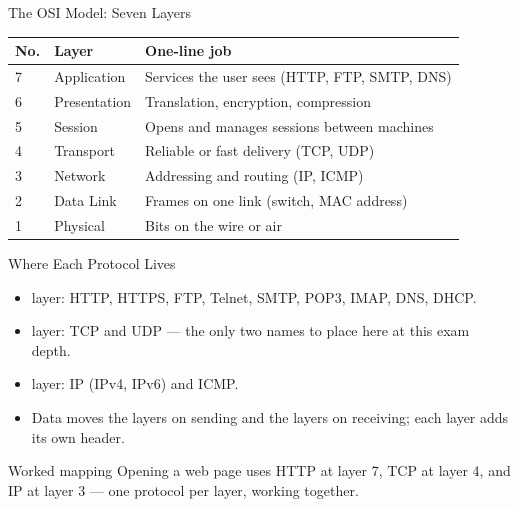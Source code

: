 \documentclass[aspectratio=169]{beamer}
\begin{document}
\begin{frame}{The OSI Model: Seven Layers}
  \begin{center}
    \begin{tabular}{p{}p{}p{}}
      \toprule
      \textbf{No.} & \textbf{Layer} & \textbf{One-line job} \\
      \midrule
      7 & Application & Services the user sees (HTTP, FTP, SMTP, DNS) \\
      6 & Presentation & Translation, encryption, compression \\
      5 & Session & Opens and manages sessions between machines \\
      4 & Transport & Reliable or fast delivery (TCP, UDP) \\
      3 & Network & Addressing and routing (IP, ICMP) \\
      2 & Data Link & Frames on one link (switch, MAC address) \\
      1 & Physical & Bits on the wire or air \\
      \bottomrule
    \end{tabular}
  \end{center}
  \vspace{0.25cm}
\end{frame}

\begin{frame}{Where Each Protocol Lives}
  \begin{itemize}
    \item {} layer: HTTP, HTTPS, FTP, Telnet, SMTP, POP3,
      IMAP, DNS, DHCP.
    \item {} layer: TCP and UDP --- the only two names to place
      here at this exam depth.
    \item {} layer: IP (IPv4, IPv6) and ICMP.
    \item Data moves  the layers on sending and  the layers
      on receiving; each layer adds its own header.
  \end{itemize}
  \begin{exampleblock}{Worked mapping}
    Opening a web page uses HTTP at layer 7, TCP at layer 4, and IP at layer
    3 --- one protocol per layer, working together.
  \end{exampleblock}
\end{frame}
\end{document}
